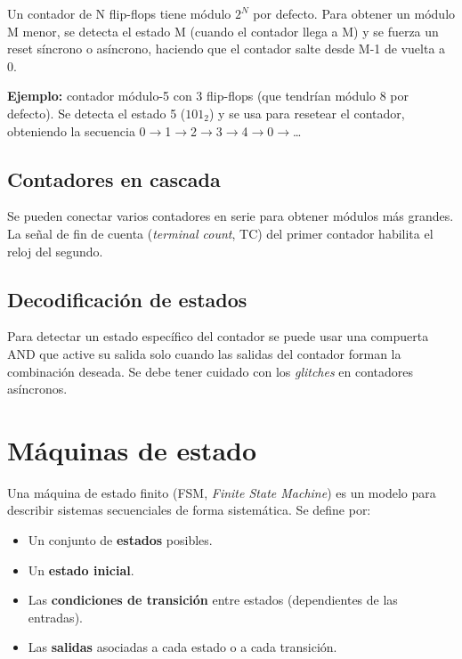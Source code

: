 Un contador de N flip-flops tiene módulo $2^N$ por defecto. Para obtener un módulo M menor, se detecta el estado M (cuando el contador llega a M) y se fuerza un reset síncrono o asíncrono, haciendo que el contador salte desde M-1 de vuelta a 0.

\textbf{Ejemplo:} contador módulo-5 con 3 flip-flops (que tendrían módulo 8 por defecto). Se detecta el estado 5 ($101_2$) y se usa para resetear el contador, obteniendo la secuencia 0$\rightarrow$1$\rightarrow$2$\rightarrow$3$\rightarrow$4$\rightarrow$0$\rightarrow$\ldots

\subsection{Contadores en cascada}

Se pueden conectar varios contadores en serie para obtener módulos más grandes. La señal de fin de cuenta (\textit{terminal count}, TC) del primer contador habilita el reloj del segundo.


\subsection{Decodificación de estados}

Para detectar un estado específico del contador se puede usar una compuerta AND que active su salida solo cuando las salidas del contador forman la combinación deseada. Se debe tener cuidado con los \textit{glitches} en contadores asíncronos.

\section{Máquinas de estado}

Una máquina de estado finito (FSM, \textit{Finite State Machine}) es un modelo para describir sistemas secuenciales de forma sistemática. Se define por:

\begin{itemize}
    \item Un conjunto de \textbf{estados} posibles.
    \item Un \textbf{estado inicial}.
    \item Las \textbf{condiciones de transición} entre estados (dependientes de las entradas).
    \item Las \textbf{salidas} asociadas a cada estado o a cada transición.
\end{itemize}

